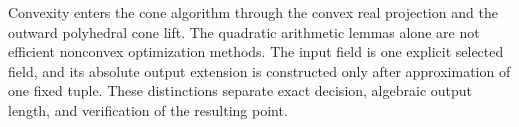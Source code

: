 Convexity enters the cone algorithm through the convex real projection and
the outward polyhedral cone lift. The quadratic arithmetic lemmas alone
are not efficient nonconvex optimization methods. The input field is one
explicit selected field, and its absolute output extension is constructed
only after approximation of one fixed tuple. These distinctions separate
exact decision, algebraic output length, and verification of the resulting
point.
